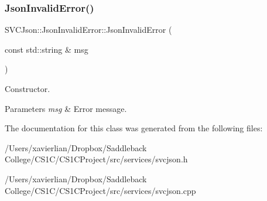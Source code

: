 \subsubsection{\texorpdfstring{JsonInvalidError()}{JsonInvalidError()}}
{\footnotesize\ttfamily S\+V\+C\+Json\+::\+Json\+Invalid\+Error\+::\+Json\+Invalid\+Error (\begin{DoxyParamCaption}\item[{const std\+::string \&}]{msg }\end{DoxyParamCaption})}



Constructor. 


\begin{DoxyParams}{Parameters}
{\em msg} & Error message. \\
\hline
\end{DoxyParams}


The documentation for this class was generated from the following files\+:\begin{DoxyCompactItemize}
\item 
/\+Users/xavierlian/\+Dropbox/\+Saddleback College/\+C\+S1\+C/\+C\+S1\+C\+Project/src/services/svcjson.\+h\item 
/\+Users/xavierlian/\+Dropbox/\+Saddleback College/\+C\+S1\+C/\+C\+S1\+C\+Project/src/services/svcjson.\+cpp\end{DoxyCompactItemize}
